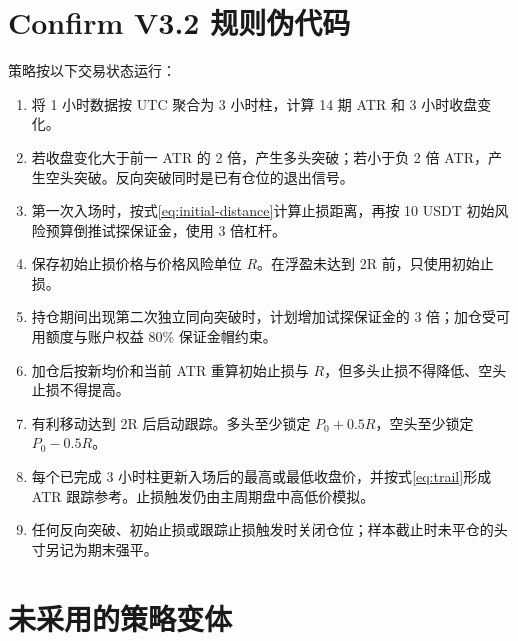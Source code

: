 \section{Confirm V3.2 规则伪代码}

策略按以下交易状态运行：

\begin{enumerate}
  \item 将 1 小时数据按 UTC 聚合为 3 小时柱，计算 14 期 ATR 和 3 小时收盘变化。
  \item 若收盘变化大于前一 ATR 的 2 倍，产生多头突破；若小于负 2 倍 ATR，产生空头突破。反向突破同时是已有仓位的退出信号。
  \item 第一次入场时，按式\eqref{eq:initial-distance}计算止损距离，再按 10 USDT 初始风险预算倒推试探保证金，使用 3 倍杠杆。
  \item 保存初始止损价格与价格风险单位 $R$。在浮盈未达到 2R 前，只使用初始止损。
  \item 持仓期间出现第二次独立同向突破时，计划增加试探保证金的 3 倍；加仓受可用额度与账户权益 80\% 保证金帽约束。
  \item 加仓后按新均价和当前 ATR 重算初始止损与 $R$，但多头止损不得降低、空头止损不得提高。
  \item 有利移动达到 2R 后启动跟踪。多头至少锁定 $P_0+0.5R$，空头至少锁定 $P_0-0.5R$。
  \item 每个已完成 3 小时柱更新入场后的最高或最低收盘价，并按式\eqref{eq:trail}形成 ATR 跟踪参考。止损触发仍由主周期盘中高低价模拟。
  \item 任何反向突破、初始止损或跟踪止损触发时关闭仓位；样本截止时未平仓的头寸另记为期末强平。
\end{enumerate}

\section{未采用的策略变体}
\label{app:failed-branches}

